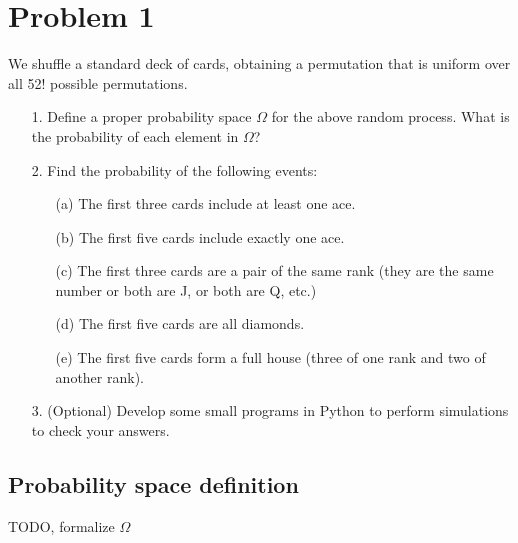 
\section{Problem 1}

We shuffle a standard deck of cards, obtaining a permutation that is uniform over all
52! possible permutations.
\begin{itemize}
	\item[1.] Define a proper probability space $\Omega$ for the above random process. What is the probability of each element in $\Omega$?
	\item[2.] Find the probability of the following events:
	\begin{itemize}
		\item[(a)] The first three cards include at least one ace.
		\item[(b)] The first five cards include exactly one ace.
		\item[(c)] The first three cards are a pair of the same rank (they are the same number or both are J, or both are Q, etc.)
		\item[(d)] The first five cards are all diamonds.
		\item[(e)] The first five cards form a full house (three of one rank and two of another rank).		
	\end{itemize}
	\item[3.] (Optional) Develop some small programs in Python to perform simulations to check your answers.
\end{itemize}


\subsection{Probability space definition}
TODO, formalize $\Omega$


